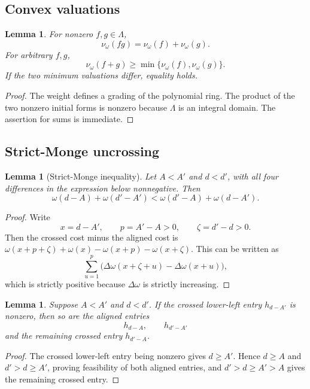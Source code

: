 \documentclass[11pt,a4paper]{amsart}
\numberwithin{equation}{section}
\theoremstyle{plain}
\newtheorem{lemma}[theorem]{Lemma}
\theoremstyle{definition}
\newcommand{\Lam}{\Lambda}
\newcommand{\wto}{\nu_{\omega}}
\begin{document}
\subsection{Convex valuations}\label{subsec:valuations}

\begin{lemma}\label{lem:valuation-laws}
For nonzero \(f,g\in\Lam\),
\[
\wto(fg)=\wto(f)+\wto(g).
\]
For arbitrary \(f,g\),
\[
\wto(f+g)\ge\min\{\wto(f),\wto(g)\}.
\]
If the two minimum valuations differ, equality holds.
\end{lemma}

\begin{proof}
The weight defines a grading of the polynomial ring.  The product of the two nonzero initial forms is nonzero because \(\Lam\) is an integral domain.  The assertion for sums is immediate.
\end{proof}

\subsection{Strict-Monge uncrossing}

\begin{lemma}[Strict-Monge inequality]\label{lem:strict-monge}
Let \(A<A'\) and \(d<d'\), with all four differences in the expression below nonnegative.  Then
\[
\omega(d-A)+\omega(d'-A')
<
\omega(d'-A)+\omega(d-A').
\]
\end{lemma}

\begin{proof}
Write
\[
x=d-A',\qquad p=A'-A>0,\qquad \zeta=d'-d>0.
\]
Then the crossed cost minus the aligned cost is \(\omega(x+p+\zeta)+\omega(x)-\omega(x+p)-\omega(x+\zeta)\).
This can be written as
\[
\sum_{u=1}^{p}\bigl(\Delta\omega(x+\zeta+u)-\Delta\omega(x+u)\bigr),
\]
which is strictly positive because \(\Delta\omega\) is strictly increasing.
\end{proof}

\begin{lemma}\label{lem:feasible-uncrossing}
Suppose \(A<A'\) and \(d<d'\).  If the crossed lower-left entry \(h_{d-A'}\) is nonzero, then so are the aligned entries
\[
h_{d-A},\qquad h_{d'-A'}
\]
and the remaining crossed entry \(h_{d'-A}\).
\end{lemma}

\begin{proof}
The crossed lower-left entry being nonzero gives \(d\ge A'\).  Hence \(d\ge A\) and \(d'>d\ge A'\), proving feasibility of both aligned entries, and \(d'>d\ge A'>A\) gives the remaining crossed entry.
\end{proof}
\end{document}

